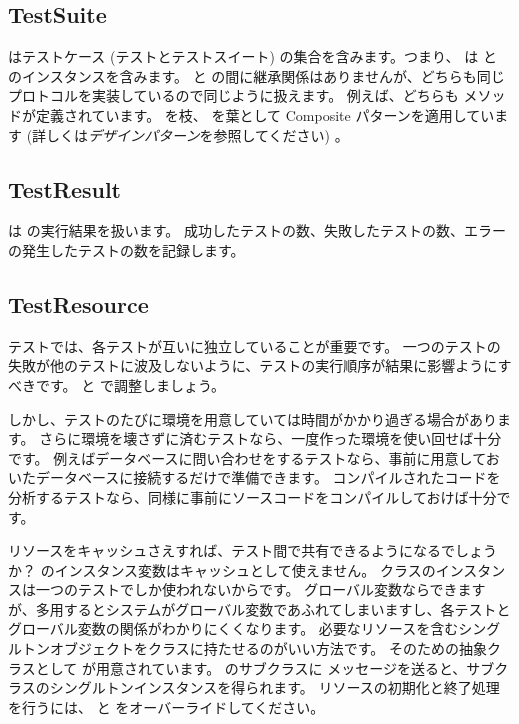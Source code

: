 \documentclass[a4paper,10pt,twoside]{book}
\begin{document}
\subsection{TestSuite}

 はテストケース (テストとテストスイート) の集合を含みます。つまり、  は  と  のインスタンスを含みます。
 と  の間に継承関係はありませんが、どちらも同じプロトコルを実装しているので同じように扱えます。
例えば、どちらも  メソッドが定義されています。
 を枝、  を葉として Composite パターンを適用しています (詳しくは\textit{デザインパターン}を参照してください) 。

\subsection{TestResult}

 は  の実行結果を扱います。
成功したテストの数、失敗したテストの数、エラーの発生したテストの数を記録します。

\subsection{TestResource}

テストでは、各テストが互いに独立していることが重要です。
一つのテストの失敗が他のテストに波及しないように、テストの実行順序が結果に影響ようにすべきです。
 と  で調整しましょう。

しかし、テストのたびに環境を用意していては時間がかかり過ぎる場合があります。
さらに環境を壊さずに済むテストなら、一度作った環境を使い回せば十分です。
例えばデータベースに問い合わせをするテストなら、事前に用意しておいたデータベースに接続するだけで準備できます。
コンパイルされたコードを分析するテストなら、同様に事前にソースコードをコンパイルしておけば十分です。

リソースをキャッシュさえすれば、テスト間で共有できるようになるでしょうか？
 のインスタンス変数はキャッシュとして使えません。
 クラスのインスタンスは一つのテストでしか使われないからです。
グローバル変数ならできますが、多用するとシステムがグローバル変数であふれてしまいますし、各テストとグローバル変数の関係がわかりにくくなります。
必要なリソースを含むシングルトンオブジェクトをクラスに持たせるのがいい方法です。
そのための抽象クラスとして  が用意されています。
 のサブクラスに  メッセージを送ると、サブクラスのシングルトンインスタンスを得られます。
リソースの初期化と終了処理を行うには、  と  をオーバーライドしてください。
\end{document}
